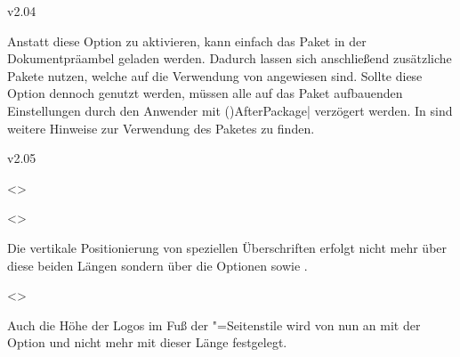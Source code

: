\begin{Cessations}{v2.04}
\begin{Cessation}
  {}
\printdeclarationlist

Anstatt diese Option zu aktivieren, kann einfach das Paket  
in der Dokumentpräambel geladen werden. Dadurch lassen sich anschließend 
zusätzliche Pakete nutzen, welche auf die Verwendung von  
angewiesen sind. Sollte diese Option dennoch genutzt werden, müssen alle auf 
das Paket  aufbauenden Einstellungen durch den Anwender mit 
\Macro*(){AfterPackage|\MPValue{\dots}} 
verzögert werden. In  sind weitere Hinweise zur Verwendung 
des Paketes  zu finden.
\end{Cessation}
\end{Cessations}



\begin{Cessations}{v2.05}
\begin{Cessation}
  {}
  <>
\begin{Cessation}
  {}
  <>
\printdeclarationlist

Die vertikale Positionierung von speziellen Überschriften erfolgt nicht mehr 
über diese beiden Längen sondern über die Optionen  
sowie .
\end{Cessation}
\end{Cessation}


\begin{Cessation}
  {}
  <>
\printdeclarationlist

Auch die Höhe der Logos im Fuß der "=Seitenstile wird 
von nun an mit der Option  und nicht mehr mit dieser 
Länge festgelegt.
\end{Cessation}
\end{Cessations}



